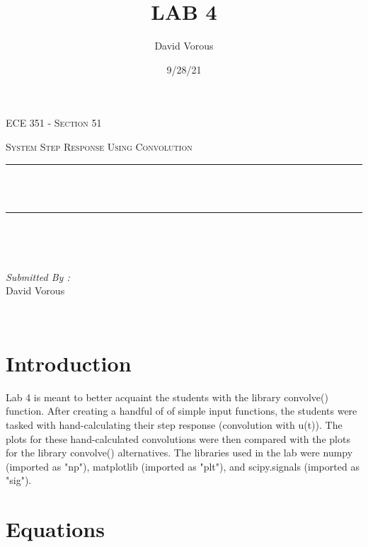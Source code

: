 \documentclass[12pt]{report}
\title{LAB 4}
\author{ David Vorous}
\date{9/28/21}
\makeatletter
\let\thetitle\@title
\makeatother
\begin{document}
\begin{titlepage}
	\centering
    \vspace*{0.5 cm}
\begin{center}    \textsc{\Large   ECE 351 - Section 51 }\\[2.0 cm]	\end{center}
	\textsc{\Large System Step Response Using Convolution  }\\[0.5 cm]
	\rule{\linewidth}{0.2 mm} \\[0.4 cm]
	{ \huge \bfseries \thetitle}\\
	\rule{\linewidth}{0.2 mm} \\[1.5 cm]
	
	\begin{minipage}{0.4\textwidth}
		\begin{flushleft} \large
			\end{flushleft}
			\end{minipage}~
			\begin{minipage}{0.4\textwidth}
            
			\begin{flushright} \large
			\emph{Submitted By :} \\
			David Vorous  
		\end{flushright}
           
	\end{minipage}\\[2 cm]

\end{titlepage}


\tableofcontents

\pagebreak

\renewcommand{\thesection}{\arabic{section}}

\section{Introduction}

Lab 4 is meant to better acquaint the students with the library convolve() function. After creating a handful of of simple input functions, the students were tasked with hand-calculating their step response (convolution with u(t)). The plots for these hand-calculated convolutions were then compared with the plots for the library convolve() alternatives. The libraries used in the lab were numpy (imported as "np"), matplotlib (imported as "plt"), and scipy.signals (imported as "sig").

\section{Equations}
\end{document}
